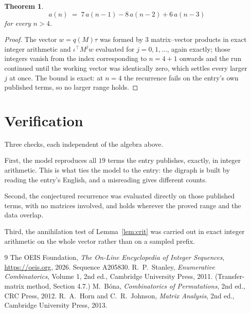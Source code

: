 \documentclass[11pt,a4paper]{article}
\theoremstyle{plain}
\newtheorem{theorem}{Theorem}
\theoremstyle{definition}
\begin{document}
\begin{theorem}
\[
a(n)\;=\;7\,a(n-1) - 8\,a(n-2) + 6\,a(n-3)
\]
for every $n>4$.
\end{theorem}

\begin{proof}
The vector $w=q(M)\tau$ was formed by $3$ matrix--vector products in exact integer
arithmetic and $\iota^{\!\top}M^{j}w$ evaluated for $j=0,1,\dots$, again exactly; those
integers vanish from the index corresponding to $n=4+1$ onwards and the run continued
until the working vector was identically zero, which settles every larger $j$ at once. The bound is exact: at $n=4$ the recurrence fails on the entry's own published terms, so no larger range holds.
\end{proof}

\section{Verification}

Three checks, each independent of the algebra above.

First, the model reproduces all $19$ terms the entry publishes, exactly, in integer
arithmetic. This is what ties the model to the entry: the digraph is built by reading the
entry's English, and a misreading gives different counts.

Second, the conjectured recurrence was evaluated directly on those published terms, with no
matrices involved, and holds wherever the proved range and the data overlap.

Third, the annihilation test of Lemma~\ref{lem:crit} was carried out in exact integer
arithmetic on the whole vector rather than on a sampled prefix.

\begin{thebibliography}{9}
 The OEIS Foundation, \emph{The On-Line Encyclopedia of Integer
Sequences}, \url{https://oeis.org}, 2026. Sequence A205830.
 R.~P.~Stanley, \emph{Enumerative Combinatorics}, Volume 1, 2nd ed.,
Cambridge University Press, 2011. (Transfer-matrix method, Section 4.7.)
 M.~B\'ona, \emph{Combinatorics of Permutations}, 2nd ed., CRC
Press, 2012.
 R.~A.~Horn and C.~R.~Johnson, \emph{Matrix Analysis}, 2nd ed., Cambridge
University Press, 2013.
\end{thebibliography}
\end{document}
